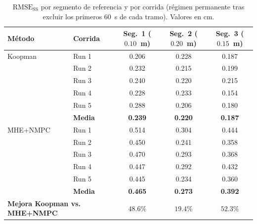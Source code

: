 \documentclass[12pt,letterpaper]{article}
\begin{document}
\begin{table}[H]
\centering
\caption{$\mathrm{RMSE}_{\mathrm{SS}}$ por segmento de 
referencia y por corrida (régimen permanente tras excluir 
los primeros $60$~s de cada tramo). Valores en cm.}
\label{tab:seg_rmse}
\footnotesize
\setlength{\tabcolsep}{4pt}
\begin{tabular}{llccc}
\toprule
\textbf{Método} & \textbf{Corrida} & 
\textbf{Seg.~1 ($0.10$~m)} & 
\textbf{Seg.~2 ($0.20$~m)} & 
\textbf{Seg.~3 ($0.15$~m)} \\
\midrule
Koopman 
  & Run 1 & 0.206 & 0.228 & 0.187 \\
  & Run 2 & 0.232 & 0.215 & 0.199 \\
  & Run 3 & 0.240 & 0.220 & 0.215 \\
  & Run 4 & 0.228 & 0.233 & 0.154 \\
  & Run 5 & 0.288 & 0.206 & 0.180 \\
  & \textbf{Media} & \textbf{0.239} & \textbf{0.220} & 
    \textbf{0.187} \\
\midrule
MHE+NMPC
  & Run 1 & 0.514 & 0.304 & 0.444 \\
  & Run 2 & 0.450 & 0.241 & 0.358 \\
  & Run 3 & 0.470 & 0.293 & 0.368 \\
  & Run 4 & 0.447 & 0.292 & 0.432 \\
  & Run 5 & 0.445 & 0.234 & 0.360 \\
  & \textbf{Media} & \textbf{0.465} & \textbf{0.273} & 
    \textbf{0.392} \\
\midrule
\multicolumn{2}{l}{\textbf{Mejora Koopman vs. MHE+NMPC}} & 
  $\mathbf{48.6\%}$ & $\mathbf{19.4\%}$ & $\mathbf{52.3\%}$ \\
\bottomrule
\end{tabular}
\end{table}
\end{document}
